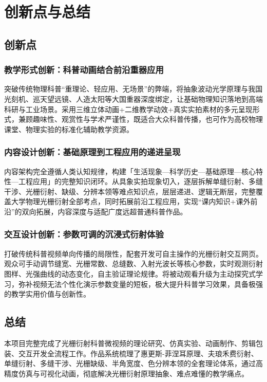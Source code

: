 \documentclass[12pt,a4paper]{ctexrep}
\begin{document}
\section{创新点与总结}

\subsection{创新点}

\subsubsection{教学形式创新：科普动画结合前沿重器应用}

突破传统物理科普“重理论、轻应用、无场景”的弊端，将抽象波动光学原理与我国光刻机、巡天望远镜、人造太阳等大国重器深度绑定，让基础物理知识落地到高端科研与工业场景。采用三维立体动画+二维教学动效+真实实拍素材的多元呈现形式，兼顾趣味性、观赏性与学术严谨性，既适合大众科普传播，也可作为高校物理课堂、物理实验的标准化辅助教学资源。

\subsubsection{内容设计创新：基础原理到工程应用的递进呈现}

内容架构完全遵循人类认知规律，构建「生活现象—科学历史—基础原理—核心特性—工程应用」的完整知识闭环。从具象实拍现象切入，逐层拆解单缝衍射、多缝干涉、光栅衍射、缺级、分辨本领等难点知识点，层层递进、逻辑无断层，完整覆盖大学物理光栅衍射全部考点，同时拓展前沿工程应用，实现“课内知识+课外前沿”的双向拓展，内容深度与适配广度远超普通科普作品。

\subsubsection{交互设计创新：参数可调的沉浸式衍射体验}

打破传统科普视频单向传播的局限性，配套开发可自主操作的光栅衍射交互网页。观众可手动调节缝宽、光栅常数、总缝数、入射光波长等核心参数，实时观测衍射图样、光强曲线的动态变化，自主验证理论规律。将被动观看升级为主动探究式学习，弥补视频无法个性化演示参数变量的短板，极大提升科普学习效果，具备极强的教学实用价值与创新性。

\subsection{总结}

本项目完整完成了光栅衍射科普微视频的理论研究、仿真实验、动画制作、剪辑包装、交互开发全流程工作。作品系统梳理了惠更斯-菲涅耳原理、夫琅禾费衍射、单缝衍射、多缝干涉、光栅缺级、半角宽度、色分辨本领的全套理论体系，通过高精度仿真与可视化动画，彻底解决光栅衍射原理抽象、难点难懂的教学痛点。
\end{document}
